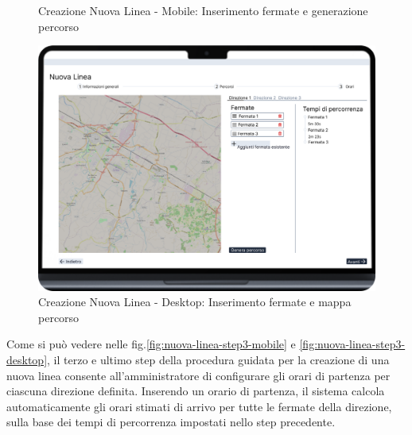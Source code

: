 \begin{figure}[H]
\begin{minipage}[b]{0.25\textwidth}
    \caption{Creazione Nuova Linea - Mobile: Inserimento fermate e generazione percorso}
    \label{fig:nuova-linea-step2-mobile}
  \end{minipage}
  \hfill
  \begin{minipage}[b]{0.68\textwidth}
    \centering
    \includegraphics[width=\textwidth]{images/mockup/Nuova Linea Step 2.png}
    \caption{Creazione Nuova Linea - Desktop: Inserimento fermate e mappa percorso}
    \label{fig:nuova-linea-step2-desktop}
  \end{minipage}
\end{figure}

Come si può vedere nelle fig.\ref{fig:nuova-linea-step3-mobile} e \ref{fig:nuova-linea-step3-desktop}, il terzo e ultimo step della procedura guidata per la creazione di una nuova linea consente all’amministratore di configurare gli orari di partenza per ciascuna direzione definita. Inserendo un orario di partenza, il sistema calcola automaticamente gli orari stimati di arrivo per tutte le fermate della direzione, sulla base dei tempi di percorrenza impostati nello step precedente.

